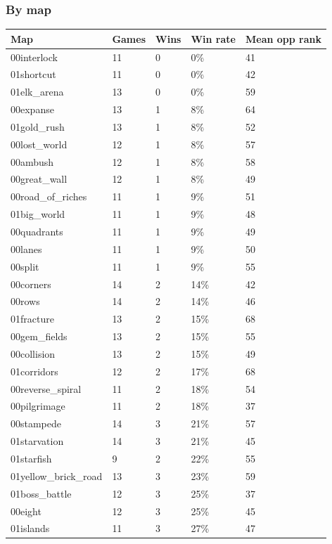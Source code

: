 \documentclass[
  10pt,
]{article}
\newcounter{none} %
\begin{document}
\subsubsection{By map}\label{by-map}

{\def\LTcaptype{none} %
\begin{longtable}[]{@{}lllll@{}}
\toprule\noalign{}
Map & Games & Wins & Win rate & Mean opp rank \\
\midrule\noalign{}
\endhead
\bottomrule\noalign{}
\endlastfoot
00interlock & 11 & 0 & 0\% & 41 \\
01shortcut & 11 & 0 & 0\% & 42 \\
01elk\_arena & 13 & 0 & 0\% & 59 \\
00expanse & 13 & 1 & 8\% & 64 \\
01gold\_rush & 13 & 1 & 8\% & 52 \\
00lost\_world & 12 & 1 & 8\% & 57 \\
00ambush & 12 & 1 & 8\% & 58 \\
00great\_wall & 12 & 1 & 8\% & 49 \\
00road\_of\_riches & 11 & 1 & 9\% & 51 \\
01big\_world & 11 & 1 & 9\% & 48 \\
00quadrants & 11 & 1 & 9\% & 49 \\
00lanes & 11 & 1 & 9\% & 50 \\
00split & 11 & 1 & 9\% & 55 \\
00corners & 14 & 2 & 14\% & 42 \\
00rows & 14 & 2 & 14\% & 46 \\
01fracture & 13 & 2 & 15\% & 68 \\
00gem\_fields & 13 & 2 & 15\% & 55 \\
00collision & 13 & 2 & 15\% & 49 \\
01corridors & 12 & 2 & 17\% & 68 \\
00reverse\_spiral & 11 & 2 & 18\% & 54 \\
00pilgrimage & 11 & 2 & 18\% & 37 \\
00stampede & 14 & 3 & 21\% & 57 \\
01starvation & 14 & 3 & 21\% & 45 \\
01starfish & 9 & 2 & 22\% & 55 \\
01yellow\_brick\_road & 13 & 3 & 23\% & 59 \\
01boss\_battle & 12 & 3 & 25\% & 37 \\
00eight & 12 & 3 & 25\% & 45 \\
01islands & 11 & 3 & 27\% & 47 \\

\end{longtable}}
\end{document}
